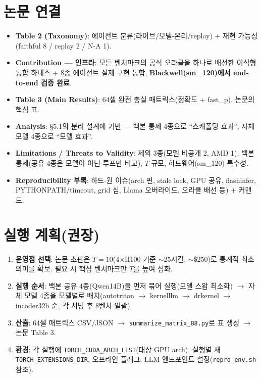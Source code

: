 \documentclass[11pt]{article}
\newcommand{\code}[1]{\texttt{\small #1}}
\begin{document}
\section{논문 연결}
\begin{itemize}
  \item \textbf{Table 2 (Taxonomy)}: 에이전트 분류(라이브/모델-온리/replay) + 재현 가능성(faithful 8 / replay 2 / N-A 1).
  \item \textbf{Contribution --- 인프라}: 모든 벤치마크의 공식 오라클을 하나로 배선한 이식형 통합 하네스 +
        8종 에이전트 실제 구현 통합, \textbf{Blackwell(sm\_120)에서 end-to-end 검증 완료}.
  \item \textbf{Table 3 (Main Results)}: 64셀 완전 충실 매트릭스(정확도 + fast\_p). 논문의 핵심 표.
  \item \textbf{Analysis}: \S5.1의 분리 설계에 기반 --- 백본 통제 4종으로 ``스캐폴딩 효과'', 자체모델 4종으로 ``모델 효과''.
  \item \textbf{Limitations / Threats to Validity}: 제외 3종(모델 비공개 2, AMD 1), 백본 통제(공유 4종은 모델이
        아닌 루프만 비교), $T$ 규모, 하드웨어(sm\_120) 특수성.
  \item \textbf{Reproducibility 부록}: 하드-원 이슈(arch 핀, stale lock, GPU 공유, flashinfer,
        PYTHONPATH/timeout, grid 심, Llama 오버라이드, 오라클 배선 등) + 커맨드.
\end{itemize}

\section{실행 계획(권장)}
\begin{enumerate}
  \item \textbf{운영점 선택}: 논문 초판은 \textbf{$T=10$}(4$\times$H100 기준 $\sim$25시간, $\sim$\$250)로 통계적 최소
        의미를 확보. 필요 시 핵심 벤치마크만 $T$를 높여 심화.
  \item \textbf{실행 순서}: 백본 공유 4종(Qwen14B)을 먼저 묶어 실행(모델 스왑 최소화) $\to$ 자체 모델 4종을
        모델별로 배치(autotriton $\to$ kernelllm $\to$ drkernel $\to$ incoder32b 순, 각 서빙 후 8벤치 일괄).
  \item \textbf{산출}: 64셀 매트릭스 CSV/JSON $\to$ \code{summarize\_matrix\_88.py}로 표 생성 $\to$ 논문 Table 3.
  \item \textbf{환경}: 각 실행에 \code{TORCH\_CUDA\_ARCH\_LIST}(대상 GPU arch), 실행별 새 \code{TORCH\_EXTENSIONS\_DIR},
        오프라인 플래그, LLM 엔드포인트 설정(\code{repro\_env.sh} 참조).
\end{enumerate}
\end{document}
